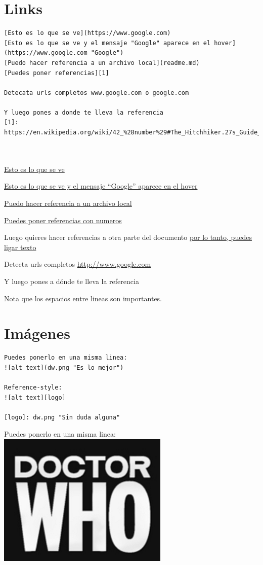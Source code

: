 \documentclass[]{article}
\begin{document}
\section{Links}\label{links}

\begin{verbatim}
[Esto es lo que se ve](https://www.google.com)
[Esto es lo que se ve y el mensaje "Google" aparece en el hover]
(https://www.google.com "Google")
[Puedo hacer referencia a un archivo local](readme.md)
[Puedes poner referencias][1]

Detecata urls completos www.google.com o google.com

Y luego pones a donde te lleva la referencia
[1]: https://en.wikipedia.org/wiki/42_%28number%29#The_Hitchhiker.27s_Guide_to_the_Galaxy



\end{verbatim}

\href{https://www.google.com}{Esto es lo que se ve}

\href{https://www.google.com}{Esto es lo que se ve y el mensaje
``Google'' aparece en el hover}

\href{readme.md}{Puedo hacer referencia a un archivo local}

\href{https://en.wikipedia.org/wiki/42_\%28number\%29\#The_Hitchhiker.27s_Guide_to_the_Galaxy}{Puedes
poner referencias con numeros}

Luego quieres hacer referencias a otra parte del documento
\href{http://www.reddit.com}{por lo tanto, puedes ligar texto}

Detecta urls completos \url{http://www.google.com}

Y luego pones a dónde te lleva la referencia

Nota que los espacios entre lineas son importantes.

\section{Imágenes}\label{imagenes}

\begin{verbatim}
Puedes ponerlo en una misma linea: 
![alt text](dw.png "Es lo mejor")

Reference-style: 
![alt text][logo]

[logo]: dw.png "Sin duda alguna"
\end{verbatim}

Puedes ponerlo en una misma linea: \includegraphics{dw.png}
\end{document}
